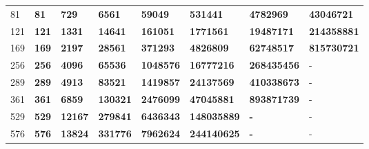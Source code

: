 \begin{table}[h]
\begin{tabular}{|l|lllllll}
81           & \textbf{81}              & \textbf{729}                                  & \textbf{6561}                       & \textbf{59049}                        & {\color[HTML]{9B9B9B} \textbf{531441}} & {\color[HTML]{9B9B9B} \textbf{4782969}}  & {\color[HTML]{9B9B9B} \textbf{43046721}}  \\ \cline{1-1}
121          & \textbf{121}             & \textbf{1331}                                 & \textbf{14641}                      & \textbf{161051}                       & \textbf{1771561}                       & {\color[HTML]{9B9B9B} \textbf{19487171}} & {\color[HTML]{9B9B9B} \textbf{214358881}} \\ \cline{1-1}
169          & \textbf{169}             & \textbf{2197}                                 & \textbf{28561}                      & \textbf{371293}                       & \textbf{4826809}                       & \textbf{62748517}                        & {\color[HTML]{9B9B9B} \textbf{815730721}} \\ \cline{1-1}
256          & \textbf{256}             & \textbf{4096}                                 & \textbf{65536}                      & \textbf{1048576}                      & \textbf{16777216}                      & \textbf{268435456}                       & -                                         \\ \cline{1-1}
289          & \textbf{289}             & \textbf{4913}                                 & \textbf{83521}                      & \textbf{1419857}                      & \textbf{24137569}                      & \textbf{410338673}                       & -                                         \\ \cline{1-1}
361          & \textbf{361}             & \textbf{6859}                                 & \textbf{130321}                     & \textbf{2476099}                      & \textbf{47045881}                      & \textbf{893871739}                       & -                                         \\ \cline{1-1}
529          & \textbf{529}             & \textbf{12167}                                & \textbf{279841}                     & \textbf{6436343}                      & \textbf{148035889}                     & \textbf{-}                               & -                                         \\ \cline{1-1}
576          & \textbf{576}             & \textbf{13824}                                & \textbf{331776}                     & \textbf{7962624}                      & \textbf{244140625}                     & \textbf{-}                               & -                                         \\ \cline{1-1}

\end{tabular}
\end{table}
